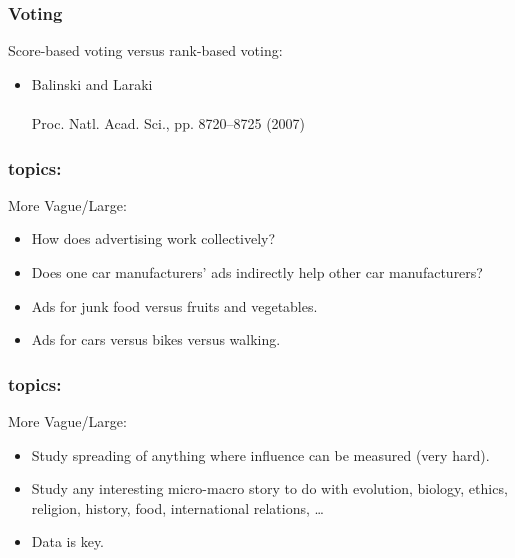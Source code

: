 \begin{frame}
  \frametitle{Voting}
 
  \begin{block}{Score-based voting versus rank-based voting:}
    \begin{itemize}
    \item 
      Balinski and Laraki\cite{balinski2007a}\\
      \\
      Proc. Natl. Acad. Sci., pp. 8720--8725 (2007)
    \end{itemize}
    
  \end{block}

\end{frame}


\begin{frame}
  \frametitle{topics:}

  \begin{block}{More Vague/Large:}
    \begin{itemize}
    \item
      How does \alert{advertising} work
      collectively?  
    \item<2-> 
      Does one car manufacturers' ads
      indirectly help other car manufacturers?
    \item<3->
      Ads for junk food versus fruits and vegetables.
    \item<4-> 
      Ads for cars versus bikes versus walking.
    \end{itemize}
  \end{block}

\end{frame}


\begin{frame}
  \frametitle{topics:}

  \begin{block}{More Vague/Large:}
  \begin{itemize}
  \item
    Study spreading of anything
    where influence can be measured (very hard).
  \item<2->
    Study any interesting micro-macro story to do
    with evolution, biology, ethics, religion, history, food,
    international relations, \ldots
  \item<3->
    Data is key.
  \end{itemize}
  \end{block}

\end{frame}



